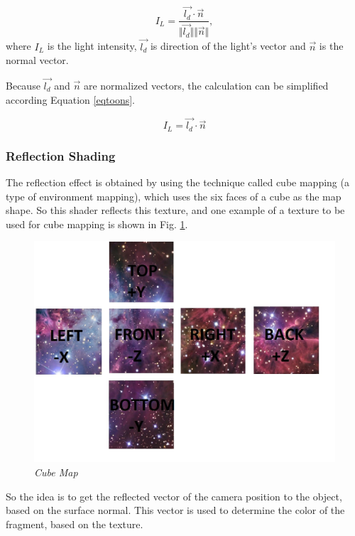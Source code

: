 \documentclass[10pt, conference, compsocconf]{IEEEtran}
\begin{document}
{	\begin{equation}
		I_ {L} = \frac{ \vec{l_{d}} \cdot \vec{n} } {\Vert \vec{l_{d}} \Vert  \Vert \vec{n} \Vert }, 
	\label{eqtoon}
	\end{equation}
	where $ I_L $ is the light intensity, $\vec{l_ {d}} $ is direction of the light's vector and $\vec {n} $ is the normal vector.

Because $\vec{l_{d}}$ and $\vec{n}$  are normalized vectors, the calculation can be simplified according Equation \ref{eqtoons}.

	\begin{equation}
		I_ {L} =  \vec{l_{d}} \cdot \vec{n}  
	\label{eqtoons}
	\end{equation}

\subsubsection{Reflection Shading}
\label{reflection}

The reflection effect is obtained by using the technique called cube mapping (a type of environment mapping), which uses the six faces of a cube as the map shape. 
So this shader reflects this texture, and one example of a texture to be used for cube mapping is shown in Fig. \ref{environment}.

	\begin{figure}[ht]
	\centering
		\includegraphics[keepaspectratio=true,scale=0.3]{figures/envmap.jpg}
	\caption{\textit{Cube Map}}
	\label{environment}
	\end{figure}

So the idea is to get the reflected vector of the camera position to the object, based on the surface normal. 
This vector is used to determine the color of the fragment, based on the texture.

}
\end{document}
